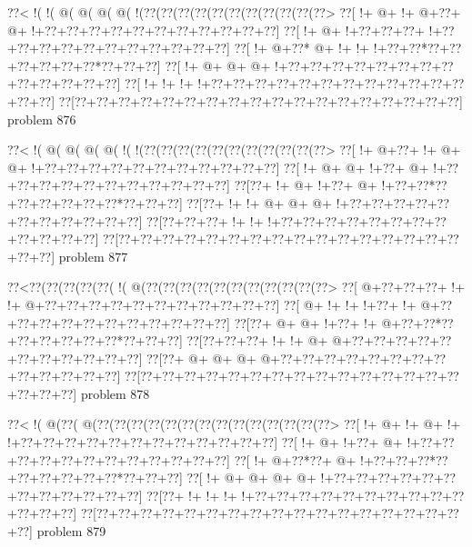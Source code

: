 \vbox{\vbox{\goo
\0??<\- !(\- !(\- @(\- @(\- @(\- @(\- !(\0??(\0??(\0??(\0??(\0??(\0??(\0??(\0??(\0??(\0??(\0??>
\0??[\- !+\- @+\- !+\- @+\0??+\- @+\- !+\0??+\0??+\0??+\0??+\0??+\0??+\0??+\0??+\0??+\0??+\0??]
\0??[\- !+\- @+\- !+\0??+\0??+\0??+\- !+\0??+\0??+\0??+\0??+\0??+\0??+\0??+\0??+\0??+\0??+\0??]
\0??[\- !+\- @+\0??*\- @+\- !+\- !+\- !+\0??+\0??*\0??+\0??+\0??+\0??+\0??+\0??*\0??+\0??+\0??]
\0??[\- !+\- @+\- @+\- @+\- !+\0??+\0??+\0??+\0??+\0??+\0??+\0??+\0??+\0??+\0??+\0??+\0??+\0??]
\0??[\- !+\- !+\- !+\- !+\0??+\0??+\0??+\0??+\0??+\0??+\0??+\0??+\0??+\0??+\0??+\0??+\0??+\0??]
\0??[\0??+\0??+\0??+\0??+\0??+\0??+\0??+\0??+\0??+\0??+\0??+\0??+\0??+\0??+\0??+\0??+\0??+\0??]
}
\hfil problem 876\hfil\break
}



\vbox{\vbox{\goo
\0??<\- !(\- @(\- @(\- @(\- @(\- !(\- !(\0??(\0??(\0??(\0??(\0??(\0??(\0??(\0??(\0??(\0??(\0??>
\0??[\- !+\- @+\0??+\- !+\- @+\- @+\- !+\0??+\0??+\0??+\0??+\0??+\0??+\0??+\0??+\0??+\0??+\0??]
\0??[\- !+\- @+\- @+\- !+\0??+\- @+\- !+\0??+\0??+\0??+\0??+\0??+\0??+\0??+\0??+\0??+\0??+\0??]
\0??[\0??+\- !+\- @+\- !+\0??+\- @+\- !+\0??+\0??*\0??+\0??+\0??+\0??+\0??+\0??*\0??+\0??+\0??]
\0??[\0??+\- !+\- !+\- @+\- @+\- @+\- !+\0??+\0??+\0??+\0??+\0??+\0??+\0??+\0??+\0??+\0??+\0??]
\0??[\0??+\0??+\0??+\- !+\- !+\- !+\0??+\0??+\0??+\0??+\0??+\0??+\0??+\0??+\0??+\0??+\0??+\0??]
\0??[\0??+\0??+\0??+\0??+\0??+\0??+\0??+\0??+\0??+\0??+\0??+\0??+\0??+\0??+\0??+\0??+\0??+\0??]
}
\hfil problem 877\hfil\break
}



\vbox{\vbox{\goo
\0??<\0??(\0??(\0??(\0??(\0??(\- !(\- @(\0??(\0??(\0??(\0??(\0??(\0??(\0??(\0??(\0??(\0??(\0??>
\0??[\- @+\0??+\0??+\0??+\- !+\- !+\- @+\0??+\0??+\0??+\0??+\0??+\0??+\0??+\0??+\0??+\0??+\0??]
\0??[\- @+\- !+\- !+\- !+\0??+\- !+\- @+\0??+\0??+\0??+\0??+\0??+\0??+\0??+\0??+\0??+\0??+\0??]
\0??[\0??+\- @+\- @+\- !+\0??+\- !+\- @+\0??+\0??*\0??+\0??+\0??+\0??+\0??+\0??*\0??+\0??+\0??]
\0??[\0??+\0??+\0??+\- !+\- !+\- @+\- @+\0??+\0??+\0??+\0??+\0??+\0??+\0??+\0??+\0??+\0??+\0??]
\0??[\0??+\- @+\- @+\- @+\- @+\0??+\0??+\0??+\0??+\0??+\0??+\0??+\0??+\0??+\0??+\0??+\0??+\0??]
\0??[\0??+\0??+\0??+\0??+\0??+\0??+\0??+\0??+\0??+\0??+\0??+\0??+\0??+\0??+\0??+\0??+\0??+\0??]
}
\hfil problem 878\hfil\break
}



\vbox{\vbox{\goo
\0??<\- !(\- @(\0??(\- @(\0??(\0??(\0??(\0??(\0??(\0??(\0??(\0??(\0??(\0??(\0??(\0??(\0??(\0??>
\0??[\- !+\- @+\- !+\- @+\- !+\- !+\0??+\0??+\0??+\0??+\0??+\0??+\0??+\0??+\0??+\0??+\0??+\0??]
\0??[\- !+\- @+\- !+\0??+\- @+\- !+\0??+\0??+\0??+\0??+\0??+\0??+\0??+\0??+\0??+\0??+\0??+\0??]
\0??[\- !+\- @+\0??*\0??+\- @+\- !+\0??+\0??+\0??*\0??+\0??+\0??+\0??+\0??+\0??*\0??+\0??+\0??]
\0??[\- !+\- @+\- @+\- @+\- @+\- !+\0??+\0??+\0??+\0??+\0??+\0??+\0??+\0??+\0??+\0??+\0??+\0??]
\0??[\0??+\- !+\- !+\- !+\- !+\0??+\0??+\0??+\0??+\0??+\0??+\0??+\0??+\0??+\0??+\0??+\0??+\0??]
\0??[\0??+\0??+\0??+\0??+\0??+\0??+\0??+\0??+\0??+\0??+\0??+\0??+\0??+\0??+\0??+\0??+\0??+\0??]
}
\hfil problem 879\hfil\break
}



